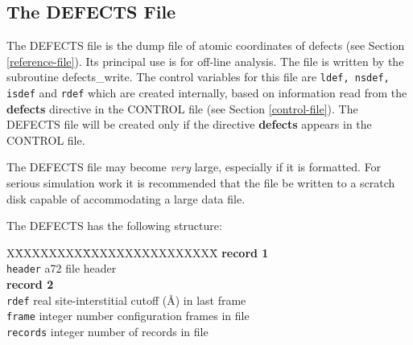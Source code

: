 \subsection{The DEFECTS File}
\label{defects-file}

The DEFECTS file is the dump file of atomic coordinates of defects
(see Section \ref{reference-file}).  Its principal use is for
off-line analysis.  The file is written by the subroutine
{\sc defects\_write}.  The control
variables for this file are {\tt ldef, nsdef, isdef} and {\tt rdef}
which are created internally, based on information read from
the {\bf defects} directive in the CONTROL file (see Section
\ref{control-file}).  The DEFECTS file will be created only if the
directive {\bf defects} appears in the CONTROL file.

The DEFECTS file may become {\em very} large, especially if it is
formatted.  For serious simulation work it is recommended that the
file be written to a scratch disk capable of accommodating a large
data file.

The DEFECTS has the following structure:
\begin{tabbing}
X\=XXXXXXXX\=XXXXXXXXXXXXXXXX\=\kill
{\bf record 1} \\
\> {\tt header}  \> a72     \> file header \\
{\bf record 2} \\
\> {\tt rdef}    \> real    \> site-interstitial cutoff (\AA) in last frame \\
\> {\tt frame}   \> integer \> number configuration frames in file \\
\> {\tt records} \> integer \> number of records in file \\
\end{tabbing}

